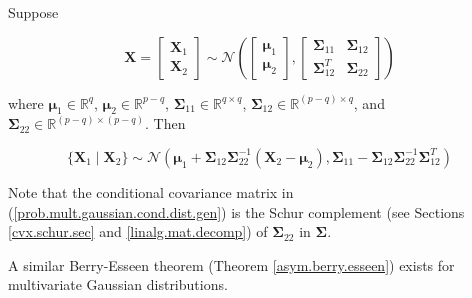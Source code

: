 \begin{proposition}\label{prob.cond.multivar.norm.dist} Suppose 

\[
\boldsymbol{X} = \begin{bmatrix} \boldsymbol{X}_1 \\ \boldsymbol{X}_2 \end{bmatrix} \sim \mathcal{N} \left( \begin{bmatrix} \boldsymbol{\mu}_1 \\ \boldsymbol{\mu}_2 \end{bmatrix}, \begin{bmatrix}  \boldsymbol{\Sigma}_{11} & \boldsymbol{\Sigma}_{12} \\ \boldsymbol{\Sigma}_{12}^T & \boldsymbol{\Sigma}_{22} \end{bmatrix} \right)
\]

where \(\boldsymbol{\mu}_1 \in \mathbb{R}^q\), \(\boldsymbol{\mu}_2 \in \mathbb{R}^{p - q}\), \(\boldsymbol{\Sigma}_{11} \in \mathbb{R}^{q \times q}\), \( \boldsymbol{\Sigma}_{12} \in \mathbb{R}^{(p-q) \times q}\), and \( \boldsymbol{\Sigma}_{22} \in \mathbb{R}^{(p-q) \times (p-q)}\). Then

\begin{equation}\label{prob.mult.gaussian.cond.dist.gen}
\{\boldsymbol{X}_1 \mid \boldsymbol{X}_2\} \sim \mathcal{N} \left(  \boldsymbol{\mu}_1 +  \boldsymbol{\Sigma}_{12} \boldsymbol{\Sigma}_{22}^{-1} \left(\boldsymbol{X}_2 - \boldsymbol{\mu}_2\right), \boldsymbol{\Sigma}_{11} - \boldsymbol{\Sigma}_{12} \boldsymbol{\Sigma}_{22}^{-1} \boldsymbol{\Sigma}_{12}^T \right)
\end{equation}

\end{proposition}

\begin{remark}
Note that the conditional covariance matrix in (\ref{prob.mult.gaussian.cond.dist.gen}) is the Schur complement (see Sections \ref{cvx.schur.sec} and \ref{linalg.mat.decomp}) of \(\boldsymbol{\Sigma}_{22}\) in \(\boldsymbol{\Sigma}\).
\end{remark}

\begin{remark} A similar Berry-Esseen theorem (Theorem \ref{asym.berry.esseen}) exists for multivariate Gaussian distributions.

\end{remark}

